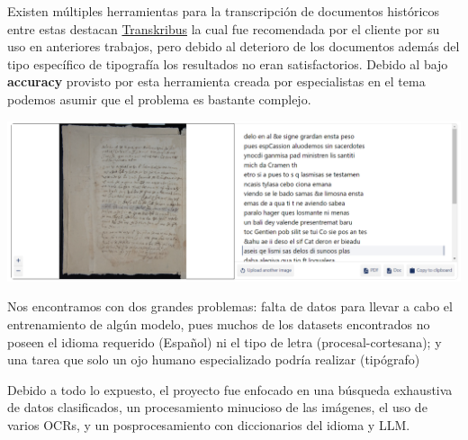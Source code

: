 \documentclass[11pt,a4paper]{article}
\begin{document}
Existen m\'ultiples herramientas para la transcripción de documentos hist\'oricos entre estas destacan \href{https://www.transkribus.org/}{Transkribus} la cual fue recomendada por el cliente por su uso en anteriores trabajos, pero debido al deterioro de los documentos adem\'as del tipo espec\'ifico de tipograf\'ia los resultados no eran satisfactorios. Debido al bajo \textbf{accuracy} provisto por esta herramienta creada por especialistas en el tema podemos asumir que el problema es bastante complejo.

\begin{center} \includegraphics[width=1.0\textwidth]{transkribus} \end{center}

Nos encontramos con dos grandes problemas: falta de datos para llevar a cabo el entrenamiento de alg\'un modelo, pues muchos de los datasets encontrados no poseen el idioma requerido (Español) ni el tipo de letra (procesal-cortesana); y una tarea que solo un ojo humano especializado podr\'ia realizar (tip\'ografo)

Debido a todo lo expuesto, el proyecto fue enfocado en una b\'usqueda exhaustiva de datos clasificados, un procesamiento minucioso de las im\'agenes, el uso de varios OCRs, y un posprocesamiento con diccionarios del idioma y LLM.
\end{document}
